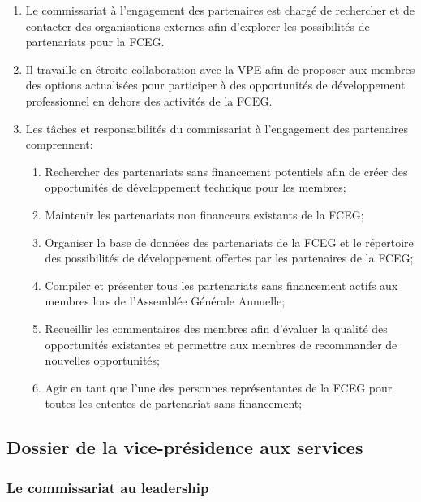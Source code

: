 \begin{enumerate}
 \item
  Le commissariat à l’engagement des partenaires est chargé de rechercher et de contacter des organisations externes afin d’explorer les possibilités de partenariats pour la FCEG.
 \item
  Il travaille en étroite collaboration avec la VPE afin de proposer aux membres des options actualisées pour participer à des opportunités de développement professionnel en dehors des activités de la FCEG.
 \item
  Les tâches et responsabilités du commissariat à l’engagement des partenaires comprennent:
  \begin{enumerate}
   \item
    Rechercher des partenariats sans financement potentiels afin de créer des opportunités de développement technique pour les membres;
   \item
    Maintenir les partenariats non financeurs existants de la FCEG;
   \item
    Organiser la base de données des partenariats de la FCEG et le répertoire des possibilités de développement offertes par les partenaires de la FCEG;
   \item
    Compiler et présenter tous les partenariats sans financement actifs aux membres lors de l’Assemblée Générale Annuelle;
   \item
    Recueillir les commentaires des membres afin d’évaluer la qualité des opportunités existantes et permettre aux membres de recommander de nouvelles opportunités;
   \item
    Agir en tant que l’une des personnes représentantes de la FCEG pour toutes les ententes de partenariat sans financement;
  \end{enumerate}
\end{enumerate}

\subsection{Dossier de la vice-présidence aux services}
\label{portefeuille-vps}

\subsubsection{Le commissariat au leadership}
\label{lela-commissaire-au-leadership}

